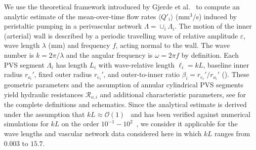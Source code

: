 \documentclass[fleqn,10pt]{wlscirep}
\begin{document}
We use the theoretical framework introduced by Gjerde et
al.~\cite{gjerde2023directional} to compute an analytic estimate of
the mean-over-time flow rates $\langle Q'_i \rangle$ (mm$^3$/s)
induced by peristaltic pumping in a perivascular network $\Lambda =
\cup_i \Lambda_i$. The motion of the inner (arterial) wall is
described by a periodic travelling wave of relative amplitude
$\varepsilon$, wave length $\lambda$ (mm) and frequency $f$, acting
normal to the wall. The wave number is $k = 2 \pi / \lambda$ and the
angular frequency is $\omega = 2 \pi f$ by definition. Each PVS
segment $\Lambda_i$ has length $L_i$ with wave-relative length $\ell_i
= k L$, baseline inner radius $r_{o_i}'$, fixed outer radius
$r_{e_i}'$, and outer-to-inner ratio $\beta_i = r_{e_i}'/r_{o_i}'$
(). These geometric parameters and the
assumption of annular cylindrical PVS segments yield hydraulic
resistances $\mathcal{R}_{o, i}$ and additional characteristic
parameters, see \cite{gjerde2023directional} for the complete
definitions and schematics. Since the analytical estimate is derived
under the assumption that $k L \approx
\mathcal{O}(1)$~\cite{gjerde2023directional} and has been verified
against numerical simulations for $k L$ on the order
$10^{-1}-10^2$~\cite[Table I]{gjerde2023directional}, we consider it
applicable for the wave lengths and vascular network data considered
here in which $k L$ ranges from $0.003$ to $15.7$.
\end{document}
